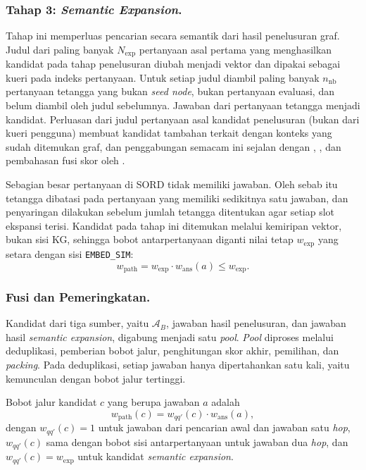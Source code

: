 \subsubsection{Tahap 3: \emph{Semantic Expansion}.}
Tahap ini memperluas pencarian secara semantik dari hasil penelusuran graf. Judul dari paling banyak $N_{\mathrm{exp}}$ pertanyaan asal pertama yang menghasilkan kandidat pada tahap penelusuran diubah menjadi vektor dan dipakai sebagai kueri pada indeks pertanyaan. Untuk setiap judul diambil paling banyak $n_{\mathrm{nb}}$ pertanyaan tetangga yang bukan \emph{seed node}, bukan pertanyaan evaluasi, dan belum diambil oleh judul sebelumnya. Jawaban dari pertanyaan tetangga menjadi kandidat. Perluasan dari judul pertanyaan asal kandidat penelusuran (bukan dari kueri pengguna) membuat kandidat tambahan terkait dengan konteks yang sudah ditemukan graf, dan penggabungan semacam ini sejalan dengan \textcite{sarmah2024hybridrag}, \textcite{Zhou2026}, dan pembahasan fusi skor oleh \textcite{Bruch2023}.

Sebagian besar pertanyaan di SORD tidak memiliki jawaban. Oleh sebab itu tetangga dibatasi pada pertanyaan yang memiliki sedikitnya satu jawaban, dan penyaringan dilakukan sebelum jumlah tetangga ditentukan agar setiap slot ekspansi terisi. Kandidat pada tahap ini ditemukan melalui kemiripan vektor, bukan sisi KG, sehingga bobot antarpertanyaan diganti nilai tetap $w_{\mathrm{exp}}$ yang setara dengan sisi \texttt{EMBED\_SIM}:
\begin{equation}
w_{\mathrm{path}} = w_{\mathrm{exp}} \cdot w_{\mathrm{ans}}(a) \leq w_{\mathrm{exp}}.
\end{equation}

\subsubsection{Fusi dan Pemeringkatan.}
Kandidat dari tiga sumber, yaitu $\mathcal{A}_B$, jawaban hasil penelusuran, dan jawaban hasil \emph{semantic expansion}, digabung menjadi satu \emph{pool}. \emph{Pool} diproses melalui deduplikasi, pemberian bobot jalur, penghitungan skor akhir, pemilihan, dan \emph{packing}. Pada deduplikasi, setiap jawaban hanya dipertahankan satu kali, yaitu kemunculan dengan bobot jalur tertinggi.

Bobot jalur kandidat $c$ yang berupa jawaban $a$ adalah
\begin{equation}
w_{\mathrm{path}}(c) = w_{qq'}(c) \cdot w_{\mathrm{ans}}(a),
\label{eq:w-path}
\end{equation}
dengan $w_{qq'}(c)=1$ untuk jawaban dari pencarian awal dan jawaban satu \emph{hop}, $w_{qq'}(c)$ sama dengan bobot sisi antarpertanyaan untuk jawaban dua \emph{hop}, dan $w_{qq'}(c)=w_{\mathrm{exp}}$ untuk kandidat \emph{semantic expansion}.

